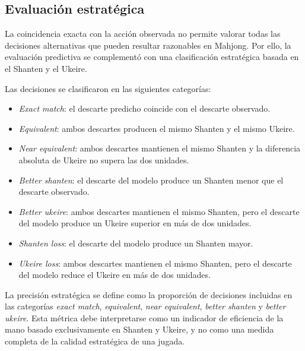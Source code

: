 \subsection{Evaluación estratégica}

La coincidencia exacta con la acción observada no permite valorar todas las decisiones alternativas que pueden resultar razonables en Mahjong. Por ello, la evaluación predictiva se complementó con una clasificación estratégica basada en el Shanten y el Ukeire.

Las decisiones se clasificaron en las siguientes categorías:

\begin{itemize}
    \item \textit{Exact match}: el descarte predicho coincide con el descarte observado.
    \item \textit{Equivalent}: ambos descartes producen el mismo Shanten y el mismo Ukeire.
    \item \textit{Near equivalent}: ambos descartes mantienen el mismo Shanten y la diferencia absoluta de Ukeire no supera las dos unidades.
    \item \textit{Better shanten}: el descarte del modelo produce un Shanten menor que el descarte observado.
    \item \textit{Better ukeire}: ambos descartes mantienen el mismo Shanten, pero el descarte del modelo produce un Ukeire superior en más de dos unidades.
    \item \textit{Shanten loss}: el descarte del modelo produce un Shanten mayor.
    \item \textit{Ukeire loss}: ambos descartes mantienen el mismo Shanten, pero el descarte del modelo reduce el Ukeire en más de dos unidades.
\end{itemize}

La precisión estratégica se define como la proporción de decisiones incluidas en las categorías \textit{exact match}, \textit{equivalent}, \textit{near equivalent}, \textit{better shanten} y \textit{better ukeire}. Esta métrica debe interpretarse como un indicador de eficiencia de la mano basado exclusivamente en Shanten y Ukeire, y no como una medida completa de la calidad estratégica de una jugada.

